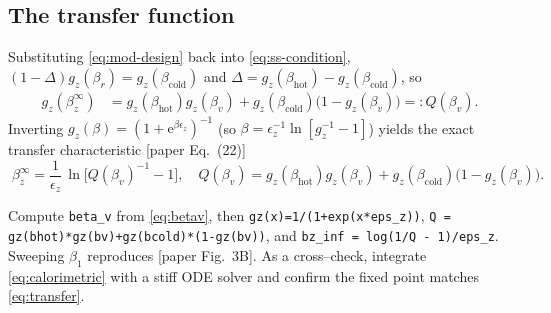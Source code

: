 \documentclass[11pt,a4paper]{article}
\newcommand{\ee}{\mathrm{e}}
\newcommand{\gz}{g_z}
\theoremstyle{definition}
\theoremstyle{remark}
\begin{document}
\subsection{The transfer function}
Substituting \eqref{eq:mod-design} back into \eqref{eq:ss-condition},
$(1-\Delta)\gz(\beta_r)=\gz(\beta_{\mathrm{cold}})$ and
$\Delta=\gz(\beta_{\mathrm{hot}})-\gz(\beta_{\mathrm{cold}})$, so
\begin{align}
\gz(\beta_z^\infty)
&= \gz(\beta_{\mathrm{hot}})\gz(\beta_v)
+ \gz(\beta_{\mathrm{cold}})\big(1-\gz(\beta_v)\big) =: Q(\beta_v).
\label{eq:Qdef}
\end{align}
Inverting $\gz(\beta)=(1+\ee^{\beta\epsilon_z})^{-1}$
(so $\beta=\epsilon_z^{-1}\ln[\gz^{-1}-1]$) yields the exact transfer
characteristic [paper Eq.~(22)]
\begin{equation}
\boxed{\;
\beta_z^\infty = \frac{1}{\epsilon_z}\,
\ln\!\big[Q(\beta_v)^{-1}-1\big],
\quad
Q(\beta_v)=\gz(\beta_{\mathrm{hot}})\gz(\beta_v)
+\gz(\beta_{\mathrm{cold}})\big(1-\gz(\beta_v)\big). \;}
\label{eq:transfer}
\end{equation}

\begin{implbox}
Compute \texttt{beta\_v} from \eqref{eq:betav}, then \texttt{gz(x)=1/(1+exp(x*eps\_z))},
\texttt{Q = gz(bhot)*gz(bv)+gz(bcold)*(1-gz(bv))}, and
\texttt{bz\_inf = log(1/Q - 1)/eps\_z}. Sweeping $\beta_1$ reproduces
[paper Fig.~3B]. As a cross--check, integrate \eqref{eq:calorimetric}
with a stiff ODE solver and confirm the fixed point matches
\eqref{eq:transfer}.
\end{implbox}
\end{document}
